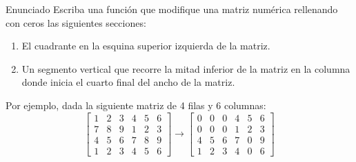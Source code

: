 \documentclass{ip-quiz}
\begin{document}
\makeheader
\maketitle

\begin{sectionbox}{Enunciado}
Escriba una función que modifique una matriz numérica rellenando con ceros las siguientes secciones:
\begin{enumerate}
  \item El cuadrante en la esquina superior izquierda de la matriz.
  \item Un segmento vertical que recorre la mitad inferior de la matriz en la columna donde inicia el cuarto final del ancho de la matriz.
\end{enumerate}
Por ejemplo, dada la siguiente matriz de 4 filas y 6 columnas:
\[
\begin{bmatrix}
1 & 2 & 3 & 4 & 5 & 6 \\
7 & 8 & 9 & 1 & 2 & 3 \\
4 & 5 & 6 & 7 & 8 & 9 \\
1 & 2 & 3 & 4 & 5 & 6
\end{bmatrix}
\xrightarrow{}
\begin{bmatrix}
0 & 0 & 0 & 4 & 5 & 6 \\
0 & 0 & 0 & 1 & 2 & 3 \\
4 & 5 & 6 & 7 & 0 & 9 \\
1 & 2 & 3 & 4 & 0 & 6
\end{bmatrix}
\]
\end{sectionbox}
\end{document}
